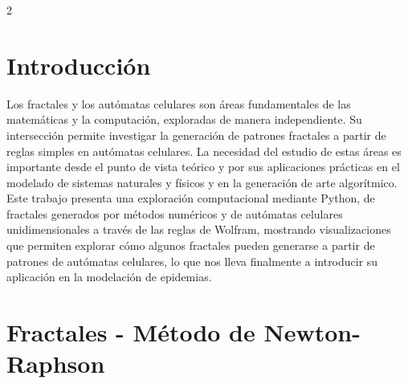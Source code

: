 \documentclass[a0,portrait]{a0poster}
\begin{document}
\begin{multicols}{2} %
\justify %
\vspace{-1.2cm}
\section*{Introducción}
\vspace{-1cm}
Los fractales y los autómatas celulares son áreas fundamentales de las matemáticas y la computación, exploradas de manera independiente. Su intersección permite investigar la generación de patrones fractales a partir de reglas simples en autómatas celulares. La necesidad del estudio de estas áreas es importante desde el punto de vista teórico y por sus aplicaciones prácticas en el modelado de sistemas naturales y físicos y en la generación de arte algorítmico. Este trabajo presenta una exploración computacional mediante Python, de fractales generados por métodos numéricos y de autómatas celulares unidimensionales a través de las reglas de Wolfram, mostrando visualizaciones que permiten explorar cómo algunos fractales pueden generarse a partir de patrones de autómatas celulares, lo que nos lleva finalmente a introducir su aplicación en la modelación de epidemias.   

\vspace{-1.0cm}
\section*{Fractales - Método de Newton-Raphson}
\vspace{-1cm}


\end{multicols}
\end{document}
